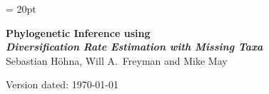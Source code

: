 \documentclass[11pt]{article}
\begin{document}
\renewcommand{\headrulewidth}{0.5pt}
\headsep = 20pt
\lhead{ }

\thispagestyle{plain}
\begin{center}

\textbf{\LARGE Phylogenetic Inference using \RevBayes}\\\vspace{2mm}
\textbf{\it{\Large Diversification Rate Estimation with Missing Taxa}}\\\vspace{2mm}
\vspace{1cm}
{\Large Sebastian H{\"o}hna, Will A.~Freyman and Mike May}
\vspace{1cm}
\end{center}

\def \ResourcePath {./}
\def \GlobalResourcePath {../}



Version dated: \today
\end{document}
